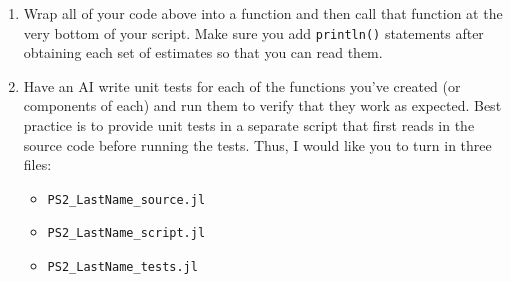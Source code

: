 \documentclass[12pt,english]{article}
\begin{document}
\begin{enumerate}
\item Wrap all of your code above into a function and then call that function at the very bottom of your script. Make sure you add \texttt{println()} statements after obtaining each set of estimates so that you can read them.

\item Have an AI write unit tests for each of the functions you've created (or components of each) and run them to verify that they work as expected. Best practice is to provide unit tests in a separate script that first reads in the source code before running the tests. Thus, I would like you to turn in three files:
    \begin{itemize}
        \item \texttt{PS2\_LastName\_source.jl}
        \item \texttt{PS2\_LastName\_script.jl}
        \item \texttt{PS2\_LastName\_tests.jl}
    \end{itemize}

\end{enumerate}
\end{document}
